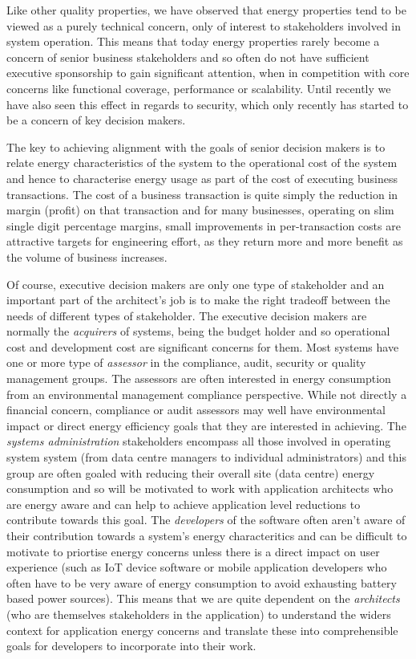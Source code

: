 Like other quality properties, we have observed that energy properties tend to be viewed as a purely technical concern, only of interest to stakeholders involved in system operation.  This means that today energy properties rarely become a concern of senior business stakeholders and so often do not have sufficient executive sponsorship to gain significant attention, when in competition with core concerns like functional coverage, performance or scalability.  Until recently we have also seen this effect in regards to security, which only recently has started to be a concern of key decision makers.

The key to achieving alignment with the goals of senior decision makers is to relate energy characteristics of the system to the operational cost of the system and hence to characterise energy usage as part of the cost of executing business transactions.  The cost of a business transaction is quite simply the reduction in margin (profit) on that transaction and for many businesses, operating on slim single digit percentage margins, small improvements in per-transaction costs are attractive targets for engineering effort, as they return more and more benefit as the volume of business increases.

Of course, executive decision makers are only one type of stakeholder and an important part of the architect's job is to make the right tradeoff between the needs of different types of stakeholder.  The executive decision makers are normally the \emph{acquirers} of systems, being the budget holder and so operational cost and development cost are significant concerns for them.  Most systems have one or more type of \emph{assessor} in the compliance, audit, security or quality management groups.  The assessors are often interested in energy consumption from an environmental management compliance perspective.  While not directly a financial concern, compliance or audit assessors may well have environmental impact or direct energy efficiency goals that they are interested in achieving.  The \emph{systems administration} stakeholders encompass all those involved in operating system system (from data centre managers to individual administrators) and this group are often goaled with reducing their overall site (data centre) energy consumption and so will be motivated to work with application architects who are energy aware and can help to achieve application level reductions to contribute towards this goal.  The \emph{developers} of the software often aren't aware of their contribution towards a system's energy characteritics and can be difficult to motivate to priortise energy concerns unless there is a direct impact on user experience (such as IoT device software or mobile application developers who often have to be very aware of energy consumption to avoid exhausting battery based power sources).  This means that we are quite dependent on the \emph{architects} (who are themselves stakeholders in the application) to understand the widers context for application energy concerns and translate these into comprehensible goals for developers to incorporate into their work.

